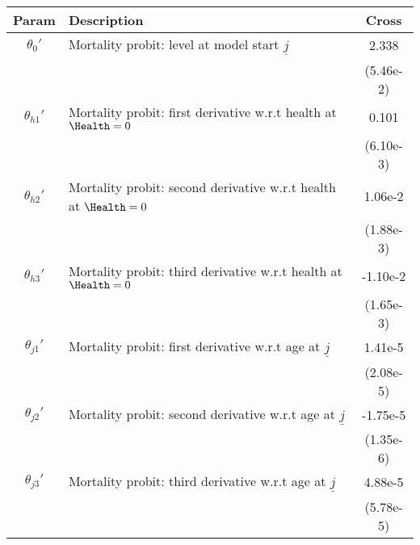 \begin{table}[ht]\label{CrossMenMortParams}
\footnotesize
\begin{center}
\begin{tabular}{clc}
\hline \hline
Param & Description & Cross \\
\hline
$\theta_{0}'$ & Mortality probit: level at model start $\underline{j}$ & 2.338 \\
 & & (5.46e-2) \\
$\theta_{h1}'$ & Mortality probit: first derivative w.r.t health at $\Health=0$ & 0.101 \\
 & & (6.10e-3) \\
$\theta_{h2}'$ & Mortality probit: second derivative w.r.t health at $\Health=0$ & 1.06e-2 \\
 & & (1.88e-3) \\
$\theta_{h3}'$ & Mortality probit: third derivative w.r.t health at $\Health=0$ & -1.10e-2 \\
 & & (1.65e-3) \\
$\theta_{j1}'$ & Mortality probit: first derivative w.r.t age at $\underline{j}$ & 1.41e-5 \\
 & & (2.08e-5) \\
$\theta_{j2}'$ & Mortality probit: second derivative w.r.t age at $\underline{j}$ & -1.75e-5 \\
 & & (1.35e-6) \\
$\theta_{j3}'$ & Mortality probit: third derivative w.r.t age at $\underline{j}$ & 4.88e-5 \\
 & & (5.78e-5) \\
\hline\hline
\end{tabular}
\end{center}
\end{table}
